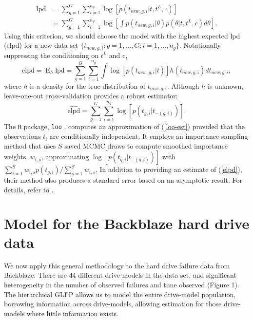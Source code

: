 \documentclass[12pt]{article}
\newcommand{\op}{\operatorname}
\begin{document}
\begin{align*}
\mbox{lpd} &= \sum_{g=1}^G \sum_{i=1}^{n_g} \log[p(t_{new,g,i}|t, t^L, c)] \\
&= \sum_{g=1}^G \sum_{i=1}^{n_g} \log \left[ \int p(t_{new,g, i}|\theta) p(\theta|t,t^L,c) d\theta \right].
\end{align*}
\noindent Using this criterion, we should choose the model with the highest expected lpd (elpd) for a new data set $\{t_{new,g,i}:g=1,\ldots,G; i=1,\ldots,n_g\}$. Notationally suppressing the conditioning on $t^L$ and $c$,
\begin{equation}
\mbox{elpd} = \op{E}_h \mbox{lpd} = \sum_{g=1}^G \sum_{i=1}^{n_g} \int \log [p(t_{new, g, i}|t)] h(t_{new,g,i}) d t_{new,g,i},
\label{elpd}
\end{equation}
where $h$ is a density for the true distribution of $t_{new,g,i}$. Although $h$ is unknown, leave-one-out cross-validation provides a robust estimator:
\begin{equation}
\widehat{\text{elpd}} = \sum_{g=1}^G \sum_{i=1}^{n_g} \log [p(t_{g,i}|t_{-(g,i)})].
\label{loo-est}
\end{equation}
The \texttt{R} package, \texttt{loo} \citep{loo}, computes an approximation of (\ref{loo-est}) provided that the observations $t_i$ are conditionally independent. It employs an importance sampling method that uses $S$ saved MCMC draws to compute smoothed importance weights, $w_{i,s}$, approximating $\log [p(t_{g,i}|t_{-(g,i)})]$ with $\sum_{i=1}^S w_{i,s} p(t_{g,i})/\sum_{s=1}^S w_{i,s}$. In addition to providing an estimate of (\ref{elpd}), their method also produces a standard error based on an asymptotic result. For details, refer to \cite{vehtari}.

\section{Model for the Backblaze hard drive data}
\label{sec:Data analysis}
We now apply this general methodology to the hard drive failure data from Backblaze.  There are 44 different drive-models in the data set, and significant heterogeneity in the number of observed failures and time observed (Figure 1). The hierarchical GLFP allows us to model the entire drive-model population, borrowing information across drive-models, allowing estimation for those drive-models where little information exists. 
\end{document}
